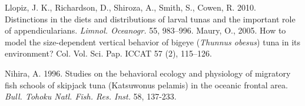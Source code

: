\begin{thebibliography}{}
 Llopiz, J. K., Richardson, D., Shiroza, A., Smith, S.,  Cowen, R. 2010. Distinctions in the diets and distributions of larval tunas and the
important role of appendicularians. \textit{Limnol. Oceanogr.} 55, 983–996.
%
%
%
%
 Maury, O., 2005. How to model the size-dependent vertical behavior of bigeye (\textit{Thunnus obesus}) tuna in its environment? Col. Vol. Sci. Pap. ICCAT 57 (2), 115–126.

%
%
%
%
 Nihira, A. 1996. Studies on the behavioral ecology and physiology of migratory fish schools of skipjack tuna (Katsuwonus pelamis) in the oceanic frontal area. \textit {Bull. Tohoku Natl. Fish. Res. Inst.} 58, 137-233. 
%
%
%
%
%


\end{thebibliography}
